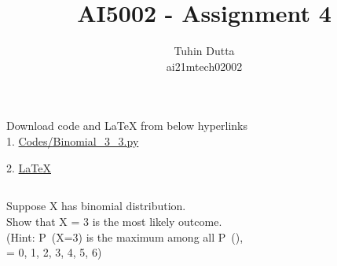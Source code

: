 \documentclass[journal,12pt,twocolumn]{IEEEtran}
\begin{document}
\providecommand{\mtx}[1]{\mathbf{#1}}
\providecommand{\fourier}{\overset{\mathcal{F}}{ \rightleftharpoons}}
\providecommand{\system}{\overset{\mathcal{H}}{ \longleftrightarrow}}
\newcommand{\solution}{\noindent \textbf{Solution: }}
\newcommand{\cosec}{\,\text{cosec}\,}
\providecommand{\dec}[2]{\ensuremath{\overset{#1}{\underset{#2}{\gtrless}}}}
\newcommand{\myvec}[1]{\ensuremath{\begin{pmatrix}#1\end{pmatrix}}}
\newcommand{\mydet}[1]{\ensuremath{\begin{vmatrix}#1\end{vmatrix}}}
\makeatletter
{}
\makeatother
\let\StandardTheFigure\thefigure
\let\vec\mathbf
\renewcommand{\thefigure}{\theproblem}
\def\putbox#1#2#3{\makebox[0in][l]{\makebox[#1][l]{}\raisebox{\baselineskip}[0in][0in]{\raisebox{#2}[0in][0in]{#3}}}}
     \def\rightbox#1{\makebox[0in][r]{#1}}
     \def\centbox#1{\makebox[0in]{#1}}
     \def\topbox#1{\raisebox{-\baselineskip}[0in][0in]{#1}}
     \def\midbox#1{\raisebox{-0.5\baselineskip}[0in][0in]{#1}}
\vspace{3cm}
\title{AI5002 - Assignment 4}
\author{Tuhin Dutta\\ ai21mtech02002}
\maketitle
\newpage
\bigskip
\renewcommand{\thefigure}{\theenumi}
\renewcommand{\thetable}{\theenumi}
\begin{mdframed}
Download code and LaTeX from below hyperlinks\\
1. \href{https://github.com/Tauhait/AI5002/blob/main/Assignment-4/Codes/Binomial\_3\_3.py}{Codes/Binomial\_3\_3.py}


2. \href{https://github.com/Tauhait/AI5002/tree/main/Assignment-4/LaTeX}{LaTeX}
\end{mdframed}
\subsection*{}
\begin{flushleft}Suppose X has binomial distribution.\\ Show that X = 3 is the most likely outcome.\\ (Hint: P\ (X=3) is the maximum among all P\ (),\\ = 0, 1, 2, 3, 4, 5, 6)\end{flushleft}
\end{document}
